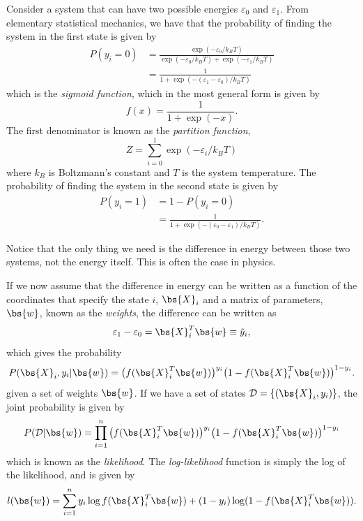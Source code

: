 Consider a system that can have two possible energies $\varepsilon_0$ and $\varepsilon_1$. From elementary statistical mechanics, we have that the probability of finding the system in the first state is given by
\begin{align}
P(y_i=0)&=\frac{\exp(-\varepsilon_0/k_BT)}{\exp(-\varepsilon_0/k_BT)+\exp(-\varepsilon_1/k_BT)}\\
&=\frac{1}{1+\exp(-(\varepsilon_1-\varepsilon_0)/k_BT)}
\end{align}
which is the \textit{sigmoid function}, which in the most general form is given by
\begin{equation}
f(x)=\frac{1}{1+\exp(-x)}.
\end{equation}
The first denominator is known as the \textit{partition function},
\begin{equation}
Z=\sum_{i=0}^1\exp(-\varepsilon_i/k_BT)
\end{equation}
where $k_B$ is Boltzmann's constant and $T$ is the system temperature. The probability of finding the system in the second state is given by
\begin{align}
P(y_i=1)&=1-P(y_i=0)\\
&=\frac{1}{1+\exp(-(\varepsilon_0-\varepsilon_1)/k_BT)}.
\end{align}

Notice that the only thing we need is the difference in energy between those two systems, not the energy itself. This is often the case in physics. 

If we now assume that the difference in energy can be written as a function of the coordinates that specify the state $i$, $\bs{X}_i$ and a matrix of parameters, $\bs{w}$, known as the \textit{weights}, the difference can be written as
\begin{equation}
\varepsilon_1-\varepsilon_0=\bs{X}_i^T\bs{w}\equiv\tilde{y}_i,
\end{equation}
which gives the probability
\begin{equation}
P(\bs{X}_i,y_i|\bs{w})=\big(f(\bs{X}_i^T\bs{w})\big)^{y_i}\big(1-f(\bs{X}_i^T\bs{w})\big)^{1-y_i}.
\end{equation}
given a set of weights $\bs{w}$. If we have a set of states $\mathcal{D}=\{(\bs{X}_i,y_i)\}$, the joint probability is given by
\begin{equation}
P(\mathcal{D}|\bs{w})=\prod_{i=1}^n\big(f(\bs{X}_i^T\bs{w})\big)^{y_i}\big(1-f(\bs{X}_i^T\bs{w})\big)^{1-y_i}
\end{equation}
which is known as the \textit{likelihood}. The \textit{log-likelihood} function is simply the log of the likelihood, and is given by 
\begin{equation}
l(\bs{w})=\sum_{i=1}^ny_i\log f(\bs{X}_i^T\bs{w})+(1-y_i)\log(1-f(\bs{X}_i^T\bs{w})).
\end{equation}

